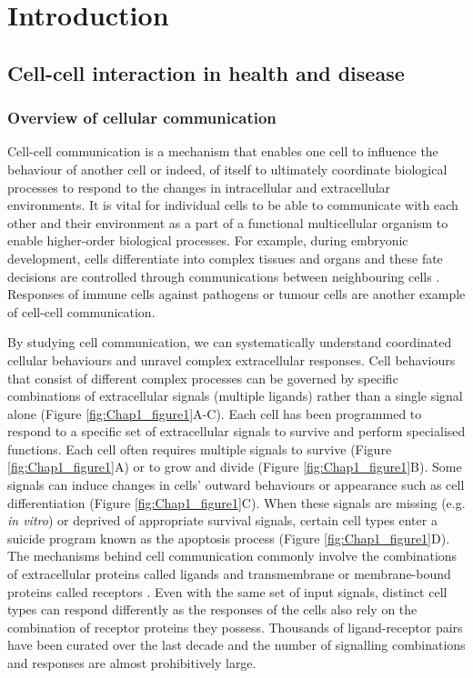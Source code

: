 \chapter[Introduction]{Introduction}
\label{Chap:Intro}


\section{Cell-cell interaction in health and disease}

\subsection{Overview of cellular communication}
Cell-cell communication is a mechanism that enables one cell to influence the behaviour of another cell or indeed, of itself to ultimately coordinate biological processes to respond to the changes in intracellular and extracellular environments. It is vital for individual cells to be able to communicate with each other and their environment as a part of a functional multicellular organism to enable higher-order biological processes. For example, during embryonic development, cells differentiate into complex tissues and organs and these fate decisions are controlled through communications between neighbouring cells \cite{gale1996eph, eichmann1997ligand}. Responses of immune cells against pathogens or tumour cells are another example of cell-cell communication. 

By studying cell communication, we can systematically understand coordinated cellular behaviours and unravel complex extracellular responses. Cell behaviours that consist of different complex processes can be governed by specific combinations of extracellular signals (multiple ligands) rather than a single signal alone (Figure \ref{fig:Chap1_figure1}A-C). Each cell has been programmed to respond to a specific set of extracellular signals to survive and perform specialised functions. Each cell often requires multiple signals to survive (Figure \ref{fig:Chap1_figure1}A) or to grow and divide (Figure \ref{fig:Chap1_figure1}B). Some signals can induce changes in cells' outward behaviours or appearance such as cell differentiation (Figure \ref{fig:Chap1_figure1}C). When these signals are missing (e.g. \textit{in vitro}) or deprived
of appropriate survival signals, certain cell types enter a suicide program known as the apoptosis process (Figure \ref{fig:Chap1_figure1}D). The mechanisms behind cell communication commonly involve the combinations of extracellular proteins called ligands and transmembrane or membrane-bound proteins called receptors \cite{alberts2018molecular}. Even with the same set of input signals, distinct cell types can respond differently as the responses of the cells also rely on the combination of receptor proteins they possess. Thousands of ligand-receptor pairs have been curated over the last decade \cite{salwinski2004database, orchard2012protein} and the number of signalling combinations and responses are almost prohibitively large.

